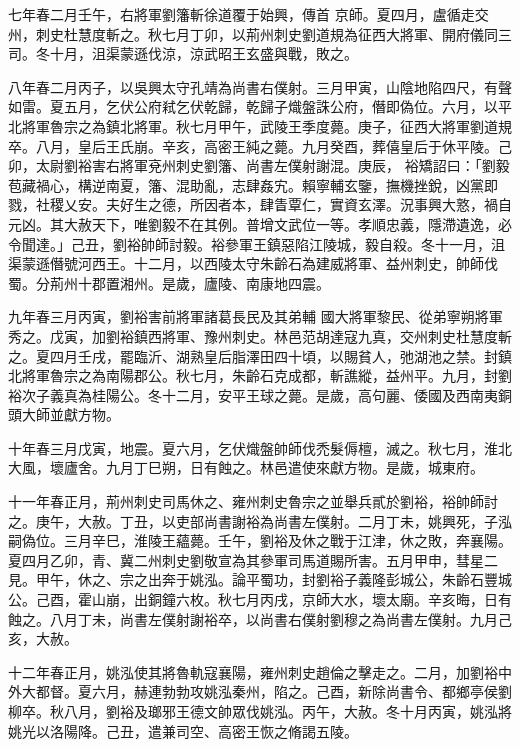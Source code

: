 \begin{pinyinscope}
 七年春二月壬午，右將軍劉籓斬徐道覆于始興，傳首
 京師。夏四月，盧循走交州，刺史杜慧度斬之。秋七月丁卯，以荊州刺史劉道規為征西大將軍、開府儀同三司。冬十月，沮渠蒙遜伐涼，涼武昭王玄盛與戰，敗之。



 八年春二月丙子，以吳興太守孔靖為尚書右僕射。三月甲寅，山陰地陷四尺，有聲如雷。夏五月，乞伏公府弒乞伏乾歸，乾歸子熾盤誅公府，僭即偽位。六月，以平北將軍魯宗之為鎮北將軍。秋七月甲午，武陵王季度薨。庚子，征西大將軍劉道規卒。八月，皇后王氏崩。辛亥，高密王純之薨。九月癸酉，葬僖皇后于休平陵。己卯，太尉劉裕害右將軍兗州刺史劉籓、尚書左僕射謝混。庚辰，
 裕矯詔曰：「劉毅苞藏禍心，構逆南夏，籓、混助亂，志肆姦宄。賴寧輔玄鑒，撫機挫銳，凶黨即戮，社稷乂安。夫好生之德，所因者本，肆眚覃仁，實資玄澤。況事興大憝，禍自元凶。其大赦天下，唯劉毅不在其例。普增文武位一等。孝順忠義，隱滯遺逸，必令聞達。」己丑，劉裕帥師討毅。裕參軍王鎮惡陷江陵城，毅自殺。冬十一月，沮渠蒙遜僭號河西王。十二月，以西陵太守朱齡石為建威將軍、益州刺史，帥師伐蜀。分荊州十郡置湘州。是歲，廬陵、南康地四震。



 九年春三月丙寅，劉裕害前將軍諸葛長民及其弟輔
 國大將軍黎民、從弟寧朔將軍秀之。戊寅，加劉裕鎮西將軍、豫州刺史。林邑范胡達寇九真，交州刺史杜慧度斬之。夏四月壬戌，罷臨沂、湖熟皇后脂澤田四十頃，以賜貧人，弛湖池之禁。封鎮北將軍魯宗之為南陽郡公。秋七月，朱齡石克成都，斬譙縱，益州平。九月，封劉裕次子義真為桂陽公。冬十二月，安平王球之薨。是歲，高句麗、倭國及西南夷銅頭大師並獻方物。



 十年春三月戊寅，地震。夏六月，乞伏熾盤帥師伐禿髮傉檀，滅之。秋七月，淮北大風，壞廬舍。九月丁巳朔，日有蝕之。林邑遣使來獻方物。是歲，城東府。



 十一年春正月，荊州刺史司馬休之、雍州刺史魯宗之並舉兵貳於劉裕，裕帥師討之。庚午，大赦。丁丑，以吏部尚書謝裕為尚書左僕射。二月丁未，姚興死，子泓嗣偽位。三月辛巳，淮陵王蘊薨。壬午，劉裕及休之戰于江津，休之敗，奔襄陽。夏四月乙卯，青、冀二州刺史劉敬宣為其參軍司馬道賜所害。五月甲申，彗星二見。甲午，休之、宗之出奔于姚泓。論平蜀功，封劉裕子義隆彭城公，朱齡石豐城公。己酉，霍山崩，出銅鐘六枚。秋七月丙戌，京師大水，壞太廟。辛亥晦，日有蝕之。八月丁未，尚書左僕射謝裕卒，以尚書右僕射劉穆之為尚書左僕射。九月己
 亥，大赦。



 十二年春正月，姚泓使其將魯軌寇襄陽，雍州刺史趙倫之擊走之。二月，加劉裕中外大都督。夏六月，赫連勃勃攻姚泓秦州，陷之。己酉，新除尚書令、都鄉亭侯劉柳卒。秋八月，劉裕及瑯邪王德文帥眾伐姚泓。丙午，大赦。冬十月丙寅，姚泓將姚光以洛陽降。己丑，遣兼司空、高密王恢之脩謁五陵。




\end{pinyinscope}
